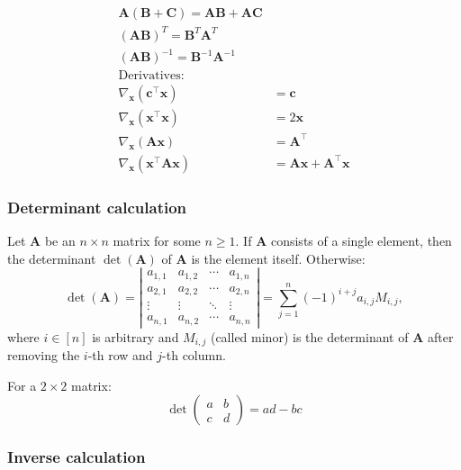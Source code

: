 \documentclass[11pt, %
	oneside, %
	english, %
	onehalfspacing, %
	parskip, %
	]{article} %
\theoremstyle{definition}
\begin{document}
\begin{align*}
	\mathbf{A}(\mathbf{B}+\mathbf{C})=\mathbf{A B}+\mathbf{A C} \\
	(\mathbf{A} \mathbf{B})^T = \mathbf{B}^T \mathbf{A}^T \\
	(\mathbf{A} \mathbf{B})^{-1} = \mathbf{B}^{-1} \mathbf{A}^{-1} \\
	\text{Derivatives:} \\
	\nabla_{\mathbf{x}}\left(\mathbf{c}^{\top} \mathbf{x}\right) & =\mathbf{c} \\
	\nabla_{\mathbf{x}}\left(\mathbf{x}^{\top} \mathbf{x}\right) & =2 \mathbf{x} \\
	\nabla_{\mathbf{x}}(\mathbf{A} \mathbf{x}) & =\mathbf{A}^{\top} \\
	\nabla_{\mathbf{x}}\left(\mathbf{x}^{\top} \mathbf{A} \mathbf{x}\right) & =\mathbf{A} \mathbf{x}+\mathbf{A}^{\top} \mathbf{x}
\end{align*}

\subsubsection*{Determinant calculation}

Let $\mathbf{A}$ be an $n \times n$ matrix for some $n \geq 1$. If $\mathbf{A}$ consists of a single element, then the determinant $\operatorname{det}(\mathbf{A})$ of $\mathbf{A}$ is the element itself. Otherwise:
$$
\operatorname{det}(\mathbf{A})=\left|\begin{array}{cccc}
a_{1,1} & a_{1,2} & \cdots & a_{1, n} \\
a_{2,1} & a_{2,2} & \cdots & a_{2, n} \\
\vdots & \vdots & \ddots & \vdots \\
a_{n, 1} & a_{n, 2} & \cdots & a_{n, n}
\end{array}\right|=\sum_{j=1}^n(-1)^{i+j} a_{i, j} M_{i, j},
$$
where $i \in[n]$ is arbitrary and $M_{i, j}$ (called minor) is the determinant of $\mathbf{A}$ after removing the $i$-th row and $j$-th column.

For a $2 \times 2$ matrix:
\begin{equation*}
	\det
	\begin{pmatrix}
		a & b \\
		c & d
	\end{pmatrix}
	= ad - bc
\end{equation*}

\subsubsection*{Inverse calculation}
\end{document}
